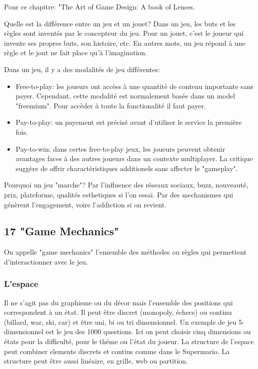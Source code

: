 Pour ce chapitre: "The Art of Game Design: A book of Lenses.

Quelle est la diff\'erence entre un jeu et un jouet? Dans un jeu, les buts et les r\`egles sont invent\'es par le concepteur du jeu. Pour un jouet, c'est le joueur qui invente ses propres buts, son histoire, etc. En autres mots, un jeu r\'epond \`a une r\`egle et le jout ne fait place qu'\`a l'imagination.

Dans un jeu, il y a des modalit\'es de jeu diff\'erentes:

\begin{itemize}
\item Free-to-play: les joueurs ont acc\`ess \`a une quantit\'e de contenu importante sans payer. Cependant, cette modalit\'e est normalement bas\'ee dans un model "freemium". Pour acc\`eder \`a toute la fonctionalit\'e il faut payer. 
\item Pay-to-play: un payement est pr\'ecis\'e avant d'utiliser le service la premi\`ere fois.
\item Pay-to-win: dans certes free-to-play jeux, les joueurs peuvent obtenir avantages faces \`a des autres joueurs dans un contexte multiplayer. La critique sugg\`ere de offrir charact\'eristiques additionels sans affecter le "gameplay".
\end{itemize}

Pourquoi un jeu "marche"? Par l'influence des r\'eseaux sociaux, buzz, nouveaut\'e, prix, plateforme, qualit\'es esthetiques si l'on essai. Par des mechanismes qui g\'en\`erent l'engagement, voire l'addiction si on revient. 

\subsection{17 "Game Mechanics"}

On appelle "game mechanics" l'ensemble des m\'ethodes ou r\`egles qui permettent d'interactionner avec le jeu.

\subsubsection{L'espace}

Il ne s'agit pas du graphisme ou du d\'ecor mais l'ensemble des positions qui correspondent \`a un \'etat. Il peut \^etre discret (monopoly, \'echecs) ou continu (billard, war, ski, car) et \^etre uni, bi ou tri dimensionnel. Un exemple de jeu 5-dimensionnel est le jeu des 1000 questions. Ici on peut choisir cinq dimensions ou \'etats pour la difficult\'e, pour le th\'eme ou l'\'etat du joueur. La structure de l'espace peut combiner elements discrets et contius comme dans le Supermario. La structure peut \^etre aussi lin\'eaire, en grille, web ou partition. 

